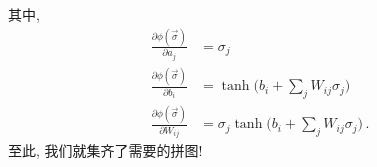 \documentclass[10pt]{article}
\begin{document}
其中,
\begin{align}
\frac{\partial\phi(\vec{\sigma})}{\partial a_{j}} & = \sigma_{j} \nonumber \\
\frac{\partial\phi(\vec{\sigma})}{\partial b_{i}} & = \tanh{\Big(b_{i}+\sum_{j}W_{ij}\sigma_{j}\Big)} \nonumber \\
\frac{\partial\phi(\vec{\sigma})}{\partial W_{ij}} & = \sigma_{j} \tanh{\Big(b_{i}+\sum_{j}W_{ij}\sigma_{j}\Big)}\,.
\end{align}
至此, 我们就集齐了需要的拼图!
\end{document}
